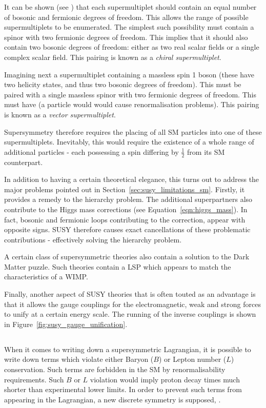 It can be shown (see \cite{susy_primer}) that each supermultiplet should contain
an equal number of bosonic and fermionic degrees of freedom. This allows the
range of possible supermultiplets to be enumerated. The simplest such
possibility must contain a spinor with two fermionic degrees of freedom. This
implies that it should also contain two bosonic degrees of freedom: either as
two real scalar fields or a single complex scalar field. This pairing is known
as a \emph{chiral supermultiplet}.

Imagining next a supermultiplet containing a massless spin 1 boson (these have
two helicity states, and thus two bosonic degrees of freedom). This must be
paired with a single massless spinor with two fermionic degrees of freedom. This
must have \spinhalf (a \spinthreetwo particle would would cause renormalisation
problems). This pairing is known as a \emph{vector supermultiplet}.

Supersymmetry therefore requires the placing of all \ac{SM} particles into one
of these supermultiplets. Inevitably, this would require the existence of a
whole range of additional particles - each possessing a spin differing by
$\frac{1}{2}$ from its \ac{SM} counterpart.

In addition to having a certain theoretical elegance, this turns out to address
the major problems pointed out in
Section~\ref{sec:susy_limitations_sm}. Firstly, it provides a remedy to the
hierarchy problem. The additional superpartners also contribute to the Higgs
mass corrections (see Equation~\ref{eqn:higgs_mass}). In fact, bosonic and
fermionic loops contributing to the correction, appear with opposite
signs. \acl{SUSY} therefore causes exact cancellations of these problematic
contributions - effectively solving the hierarchy problem.

A certain class of supersymmetric theories also contain a solution to the Dark
Matter puzzle. Such theories contain a \acl{LSP} which appears to match the
characteristics of a \ac{WIMP}.

Finally, another aspect of \ac{SUSY} theories that is often touted as an
advantage is that it allows the gauge couplings for the electromagnetic, weak
and strong forces to unify at a certain energy scale. The running of the inverse
couplings is shown in Figure~\ref{fig:susy_gauge_unification}.

\subsection[R-Parity]{\Rparity}
When it comes to writing down a supersymmetric Lagrangian, it is possible to
write down terms which violate either Baryon ($B$) or Lepton number ($L$)
conservation. Such terms are forbidden in the \ac{SM} by renormalisability
requirements. Such $B$ or $L$ violation would imply proton decay times much
shorter than experimental lower limits. In order to prevent such terms from
appearing in the Lagrangian, a new discrete symmetry is supposed, \Rparity.


